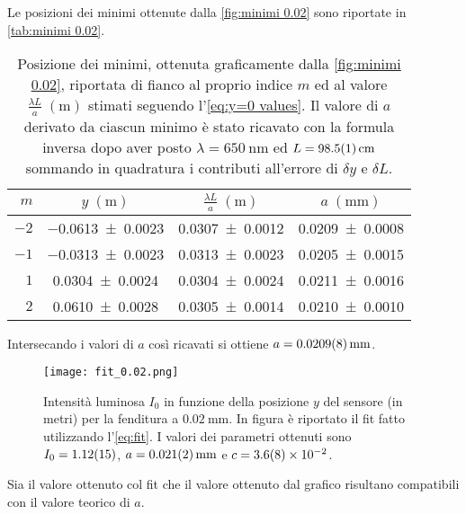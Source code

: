 \documentclass[../main.tex]{subfiles}
\begin{document}
Le posizioni dei minimi ottenute dalla \autoref{fig:minimi 0.02} sono riportate in \autoref{tab:minimi 0.02}.

\begin{table}[ht!]
    \centering
    \caption{Posizione dei minimi, ottenuta graficamente dalla \autoref{fig:minimi 0.02}, riportata di fianco al proprio indice $m$ ed al valore $\frac{\lambda L}{a} \; (\si{\metre})$ stimati seguendo l'\autoref{eq:y=0 values}. Il valore di $a$ derivato da ciascun minimo è stato ricavato con la formula inversa dopo aver posto $\lambda = \qty{650}{\nm}$ ed $L = \qty{98.5+-0.1}{\cm}$ sommando in quadratura i contributi all'errore di $\delta y$ e $\delta L$.}
    \begin{tabular}{r|cc|c}
        \toprule
        $m$  & $y \; (\si{\metre})$ & $\frac{\lambda L}{a} \; (\si{\metre})$ & $a \; (\si{\mm})$ \\
        \midrule
        $-2$ & \num{-0.0613+-0.0023} & \num{0.0307+-0.0012} & \num{0.0209+-0.0008} \\
        $-1$ & \num{-0.0313+-0.0023} & \num{0.0313+-0.0023} & \num{0.0205+-0.0015} \\
        $1$  & \num{0.0304+-0.0024}  & \num{0.0304+-0.0024} & \num{0.0211+-0.0016} \\
        $2$  & \num{0.0610+-0.0028}  & \num{0.0305+-0.0014} & \num{0.0210+-0.0010} \\
        \bottomrule
    \end{tabular}
    \label{tab:minimi 0.02}
\end{table}

Intersecando i valori di $a$ così ricavati si ottiene $a = \qty{0.0209+-0.0008}{\mm}$.


\begin{figure}[ht!]
    \centering
    \texttt{[image: fit\_0.02.png]}
    \caption{Intensità luminosa $I_{0}$ in funzione della posizione $y$ del sensore (in metri) per la fenditura a $\qty{0.02}{\mm}$. In figura è riportato il fit fatto utilizzando l'\autoref{eq:fit}. I valori dei parametri ottenuti sono $I_{0} = \num{1.12+-0.15}$, $a = \qty{0.021+-0.002}{\mm}$ e $c = \num{3.6+-0.8e-2}$. }
    \label{fig:fit 0.02}
\end{figure}

Sia il valore ottenuto col fit che il valore ottenuto dal grafico risultano compatibili con il valore teorico di $a$.
\end{document}
